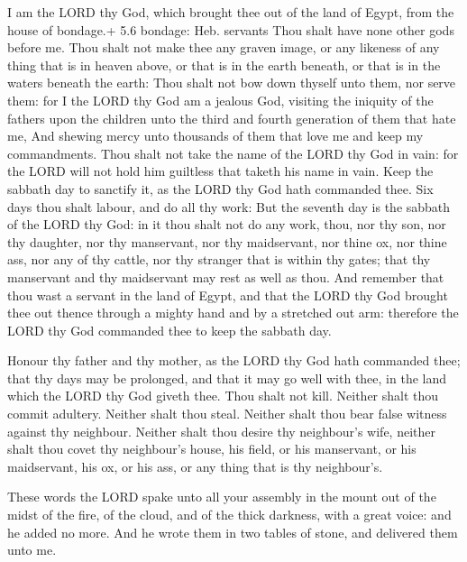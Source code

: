  I am the LORD thy God, which brought thee out of the land
of Egypt, from the house of bondage.+ 5.6 bondage: Heb. servants
 Thou shalt have none other gods before me. 
Thou shalt not make thee any graven image, or any likeness of any thing
that is in heaven above, or that is in the earth beneath, or that is in
the waters beneath the earth:  Thou shalt not bow down
thyself unto them, nor serve them: for I the LORD thy God am a jealous
God, visiting the iniquity of the fathers upon the children unto the
third and fourth generation of them that hate me,  And
shewing mercy unto thousands of them that love me and keep my
commandments.  Thou shalt not take the name of the LORD thy
God in vain: for the LORD will not hold him guiltless that taketh his
name in vain.  Keep the sabbath day to sanctify it, as the
LORD thy God hath commanded thee.  Six days thou shalt
labour, and do all thy work:  But the seventh day is the
sabbath of the LORD thy God: in it thou shalt not do any work, thou, nor
thy son, nor thy daughter, nor thy manservant, nor thy maidservant, nor
thine ox, nor thine ass, nor any of thy cattle, nor thy stranger that is
within thy gates; that thy manservant and thy maidservant may rest as
well as thou.  And remember that thou wast a servant in the
land of Egypt, and that the LORD thy God brought thee out thence through
a mighty hand and by a stretched out arm: therefore the LORD thy God
commanded thee to keep the sabbath day.

 Honour thy father and thy mother, as the LORD thy God
hath commanded thee; that thy days may be prolonged, and that it may go
well with thee, in the land which the LORD thy God giveth thee.
 Thou shalt not kill.  Neither shalt thou
commit adultery.  Neither shalt thou steal. 
Neither shalt thou bear false witness against thy neighbour.
 Neither shalt thou desire thy neighbour's wife, neither
shalt thou covet thy neighbour's house, his field, or his manservant, or
his maidservant, his ox, or his ass, or any thing that is thy
neighbour's.

 These words the LORD spake unto all your assembly in the
mount out of the midst of the fire, of the cloud, and of the thick
darkness, with a great voice: and he added no more. And he wrote them in
two tables of stone, and delivered them unto me.

